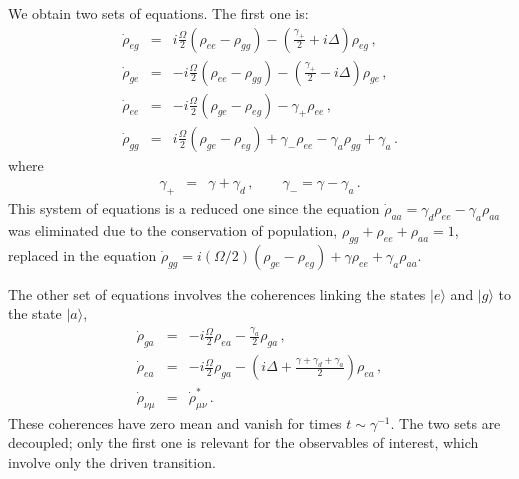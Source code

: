\documentclass[twocolumn,aps,eqsecnum,showkeys,amsmath]{revtex4-2}
\begin{document}
We obtain two sets of equations. The first one is:  
%
\begin{eqnarray} 	\label{eq:dotrho_jk}
\dot{\rho}_{eg} &=& i\frac{\Omega}{2} (\rho_{ee} -\rho_{gg})
 -\left( \frac{\gamma_+}{2}  +i\Delta \right) \rho_{eg} \,, \\
%
\dot{\rho}_{ge} &=& -i\frac{\Omega}{2} (\rho_{ee} -\rho_{gg})
 -\left( \frac{\gamma_+}{2}  -i\Delta \right) \rho_{ge} 	\,,
 	\nonumber 	\\
%
\dot{\rho}_{ee} &=& -i\frac{\Omega}{2} (\rho_{ge} -\rho_{eg})
 	-\gamma_+ \rho_{ee} 	\,,	\nonumber 	\\
%
\dot{\rho}_{gg} &=& i\frac{\Omega}{2} (\rho_{ge} -\rho_{eg})  
	+\gamma_- \rho_{ee} -\gamma_a \rho_{gg} 
	+\gamma_a \,.	 	\nonumber 	
\end{eqnarray}
where
%
\begin{eqnarray}
\gamma_+ &=& \gamma + \gamma_d \,, 	\qquad 
\gamma_- = \gamma - \gamma_a \,.
\end{eqnarray}
This system of equations is a reduced one since the equation 
$\dot{\rho}_{aa} = \gamma_d \rho_{ee} -\gamma_a \rho_{aa}$ was 
eliminated due to the conservation of population, 
$\rho_{gg} +\rho_{ee} +\rho_{aa} =1$, replaced in the equation 
$\dot{\rho}_{gg} = i (\Omega/2) (\rho_{ge} -\rho_{eg})  
	+\gamma \rho_{ee} +\gamma_a \rho_{aa}$.

The other set of equations involves the coherences linking the states 
$|e \rangle$ and $|g \rangle$ to the state $|a \rangle$, 
%
\begin{eqnarray*}
\dot{\rho}_{ga} &=& -i\frac{\Omega}{2} \rho_{ea} 
	-\frac{\gamma_a}{2} \rho_{ga} 	\,,\\
\dot{\rho}_{ea} &=& -i\frac{\Omega}{2} \rho_{ga} -\left( i\Delta 
	+\frac{\gamma +\gamma_d +\gamma_a}{2}  \right) \rho_{ea} \,, \\
\dot{\rho}_{\nu \mu} &=& \dot{\rho}_{\mu \nu}^{\ast} 	\,.
\end{eqnarray*}
These coherences have zero mean and vanish for times 
$t \sim \gamma^{-1}$. The two sets are decoupled; only the first one 
is relevant for the observables of interest, which involve only the driven 
transition. 
\end{document}
